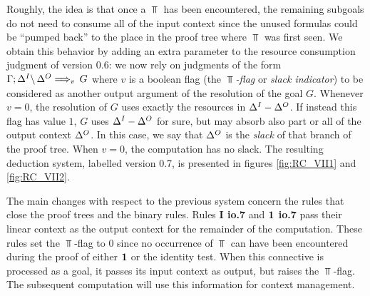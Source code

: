 Roughly, the idea is that once a $\Top$ has been encountered, the remaining
subgoals do not need to consume all of the input context since the unused
formulas could be ``pumped back'' to the place in the proof tree where $\Top$
was first seen. We obtain this behavior by adding an extra parameter to the
resource consumption judgment of version 0.6: we now rely on judgments of the
form $\ioVII{\G;\D^I}{\D^O}{G}{v}$ where $v$ is a boolean flag (the {\em
  $\Top$-flag\/} or {\em slack indicator\/}) to be considered as another
output argument of the resolution of the goal $G$. Whenever $v = 0$, the
resolution of $G$ uses exactly the resources in $\D^I - \D^O$. If instead
this flag has value $1$, $G$ uses $\D^I - \D^O$ for sure, but may absorb also
part or all of the output context $\D^O$. In this case, we say that $\D^O$ is
the {\em slack\/} of that branch of the proof tree.  When $v = 0$, the
computation has no slack. The resulting deduction system, labelled version
0.7, is presented in figures \ref{fig:RC_VII1} and \ref{fig:RC_VII2}.

The main changes with respect to the previous system concern the rules that
close the proof trees and the binary rules. Rules {\bf I io.7} and {\bf
  $\One$ io.7} pass their linear context as the output context for the
remainder of the computation. These rules set the $\Top$-flag to $0$ since no
occurrence of $\Top$ can have been encountered during the proof of either
$\One$ or the identity test. When this connective is processed as a goal, it
passes its input context as output, but raises the $\Top$-flag.  The
subsequent computation will use this information for context management.


